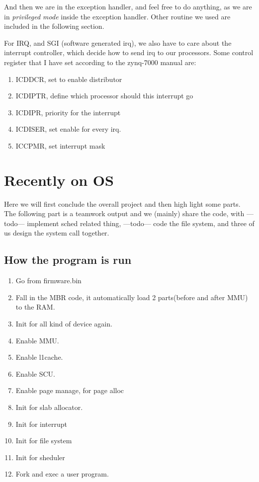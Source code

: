 \documentclass{article}
\begin{document}
And then we are in the exception handler, and feel free to do anything, as we are in \emph{privileged mode} inside the exception handler. Other routine we used are included in the following section.

For IRQ, and SGI (software generated irq), we also have to care about the interrupt controller, which decide how to send irq to our processors. Some control register that I have set according to the zynq-7000 manual are:
\begin{enumerate}
	\item	ICDDCR, set to enable distributor
	\item	ICDIPTR, define which processor should this interrupt go
	\item	ICDIPR, priority for the interrupt
	\item	ICDISER, set enable for every irq.
	\item	ICCPMR, set interrupt mask
\end{enumerate}

\section{Recently on OS}

Here we will first conclude the overall project and then high light some parts. The following part is a teamwork output and we (mainly) share the code, with ---todo--- implement sched related thing, ---todo--- code the file system, and three of us design the system call together. 

\subsection{How the program is run}
\begin{enumerate}
	\item	Go from firmware.bin
	\item	Fall in the MBR code, it automatically load 2 parts(before and after MMU) to the RAM.
	\item Init for all kind of device again.
	\item Enable MMU.
	\item	Enable l1cache.
	\item	Enable SCU.
	\item	Enable page manage, for page alloc
	\item	Init for slab allocator.
	\item	Init for interrupt
	\item	Init for file system
	\item Init for sheduler
	\item	Fork and exec a user program.
\end{enumerate}
\end{document}
